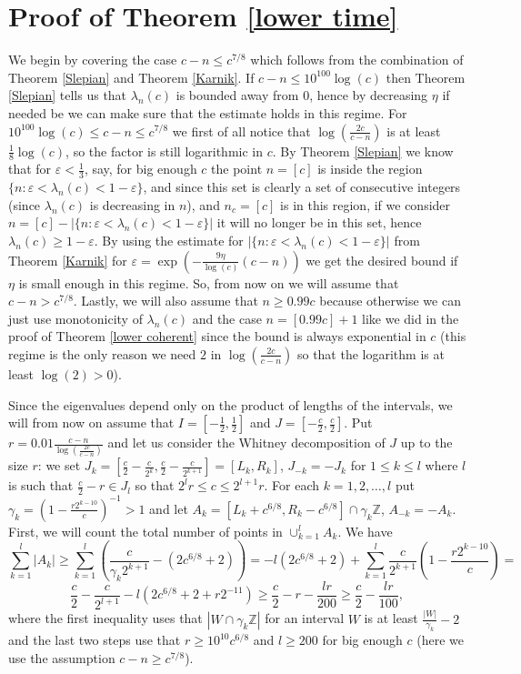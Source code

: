 \documentclass[12pt]{amsart}
\numberwithin{equation}{section}
\newcommand{\Z}{\mathbb{Z}}
\newcommand{\eps}{\varepsilon}
\begin{document}
\section{Proof of Theorem \ref{lower time}}
We begin by covering the case $c-n \le c^{7/8}$ which follows from the combination of Theorem \ref{Slepian} and Theorem \ref{Karnik}. If $c-n \le 10^{100}\log(c)$ then Theorem \ref{Slepian} tells us that $\lambda_n(c)$ is bounded away from $0$, hence by decreasing $\eta$ if needed be we can make sure that the estimate holds in this regime. For $10^{100}\log(c) \le c - n \le c^{7/8}$ we first of all notice that $\log(\frac{2c}{c-n})$ is at least $\frac{1}{8}\log(c)$, so the factor is still logarithmic in $c$. By Theorem \ref{Slepian} we know that for $\eps < \frac{1}{3}$, say, for big enough $c$ the point $n = [c]$ is inside the region $\{n: \eps < \lambda_n(c) < 1-\eps\}$, and since this set is clearly a set of consecutive integers (since $\lambda_n(c)$ is decreasing in $n$), and $n_c = [c]$ is in this region, if we consider $n = [c] - |\{n:\eps < \lambda_n(c) < 1-\eps\}|$ it will no longer be in this set, hence $\lambda_n(c) \ge 1-\eps$. By using the estimate for $|\{n:\eps < \lambda_n(c) < 1-\eps\}|$ from Theorem \ref{Karnik} for $\eps = \exp(-\frac{9\eta}{\log(c)}(c-n))$ we get the desired bound if $\eta$ is small enough in this regime. So, from now on we will assume that $c-n > c^{7/8}$. Lastly, we will also assume that $n \ge 0.99 c$ because otherwise we can just use monotonicity of $\lambda_n(c)$ and the case $n = [0.99c]+1$ like we did in the proof of Theorem \ref{lower coherent} since the bound is always exponential in $c$ (this regime is the only reason we need $2$ in $\log(\frac{2c}{c-n})$ so that the logarithm is at least $\log(2)>0$).

Since the eigenvalues depend only on the product of lengths of the intervals, we will from now on assume that $I = [-\frac{1}{2},\frac{1}{2}]$ and $J = [-\frac{c}{2},\frac{c}{2}]$. Put $r = 0.01 \frac{c-n}{\log(\frac{2c}{c-n})}$ and let us consider the Whitney decomposition of $J$ up to the size $r$: we set $J_k = [\frac{c}{2}-\frac{c}{2^{k}},\frac{c}{2}-\frac{c}{2^{k+1}}] = [L_k, R_k]$, $J_{-k} =-J_k$ for $1\le k\le l$ where $l$ is such that $\frac{c}{2}-r\in J_l$ so that $2^{l}r \le c \le 2^{l+1}r$. For each $k = 1, 2,\ldots , l$ put $\gamma_k = \left(1 - \frac{r2^{k-10}}{c}\right)^{-1} > 1$ and let $A_k = [L_k + c^{6/8}, R_k-c^{6/8}]\cap \gamma_k\Z$, $A_{-k} = -A_k$. First, we will count the total number of points in $\cup_{k=1}^l A_k$. We have
$$\sum_{k=1}^l |A_k| \ge \sum_{k=1}^l \left(\frac{c}{\gamma_k 2^{k+1}} - (2c^{6/8}+2) \right)= -l(2c^{6/8}+2)+\sum_{k=1}^l \frac{c}{2^{k+1}}\left(1-\frac{r2^{k-10}}{c}\right)=$$
$$\frac{c}{2} - \frac{c}{2^{l+1}}-l(2c^{6/8}+2+r2^{-11}) \ge \frac{c}{2}-r-\frac{lr}{200}\ge \frac{c}{2}-\frac{lr}{100},$$
where the first inequality uses that $|W\cap \gamma_k\Z|$ for an interval $W$ is at least $\frac{|W|}{\gamma_k}-2$ and the last two steps use that $r\ge 10^{10}c^{6/8}$ and $l\ge 200$ for big enough $c$ (here we use the assumption $c-n\ge c^{7/8}$).
\end{document}
